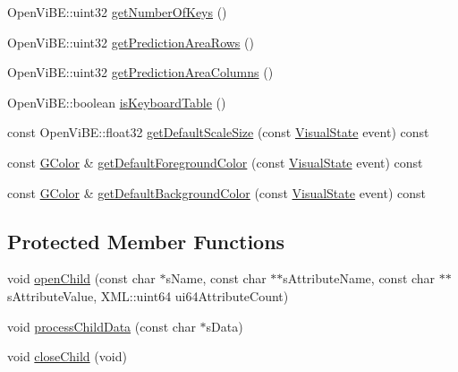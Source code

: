 \begin{DoxyCompactItemize}
\item 
OpenViBE::uint32 \hyperlink{classOpenViBEApplications_1_1P300ScreenLayoutReader_a62a2afab23d2b1f8b97536ae1f36a710}{getNumberOfKeys} ()
\item 
OpenViBE::uint32 \hyperlink{classOpenViBEApplications_1_1P300ScreenLayoutReader_aa43dc195fd6f2fce4a95fca49c80af66}{getPredictionAreaRows} ()
\item 
OpenViBE::uint32 \hyperlink{classOpenViBEApplications_1_1P300ScreenLayoutReader_a5304b41af64fad85b92f1baae762bcba}{getPredictionAreaColumns} ()
\item 
OpenViBE::boolean \hyperlink{classOpenViBEApplications_1_1P300ScreenLayoutReader_adaf0b4a335fe28444769fa1ef676bb49}{isKeyboardTable} ()
\item 
const OpenViBE::float32 \hyperlink{classOpenViBEApplications_1_1P300ScreenLayoutReader_ac914b0fde2bc702292c6ef4229f79bfb}{getDefaultScaleSize} (const \hyperlink{ova__defines_8h_ac2575a0c79ceb4592555fa66f173dfc8}{VisualState} event) const 
\item 
const \hyperlink{structOpenViBEApplications_1_1GColor}{GColor} \& \hyperlink{classOpenViBEApplications_1_1P300ScreenLayoutReader_a0861d4ca74addcd47a40747d2ef98d99}{getDefaultForegroundColor} (const \hyperlink{ova__defines_8h_ac2575a0c79ceb4592555fa66f173dfc8}{VisualState} event) const 
\item 
const \hyperlink{structOpenViBEApplications_1_1GColor}{GColor} \& \hyperlink{classOpenViBEApplications_1_1P300ScreenLayoutReader_a364d618f2a20d9900362d3b8989ead3e}{getDefaultBackgroundColor} (const \hyperlink{ova__defines_8h_ac2575a0c79ceb4592555fa66f173dfc8}{VisualState} event) const 
\end{DoxyCompactItemize}
\subsection*{Protected Member Functions}
\begin{DoxyCompactItemize}
\item 
void \hyperlink{classOpenViBEApplications_1_1P300ScreenLayoutReader_aa3bfbdacafec5b5d2e2e564769c21e64}{openChild} (const char $\ast$sName, const char $\ast$$\ast$sAttributeName, const char $\ast$$\ast$sAttributeValue, XML::uint64 ui64AttributeCount)
\item 
void \hyperlink{classOpenViBEApplications_1_1P300ScreenLayoutReader_a652b6100d2e3957b7d306b514bb22330}{processChildData} (const char $\ast$sData)
\item 
void \hyperlink{classOpenViBEApplications_1_1P300ScreenLayoutReader_a8a2a08c1b3c8fba576088894b9be9c22}{closeChild} (void)
\end{DoxyCompactItemize}
